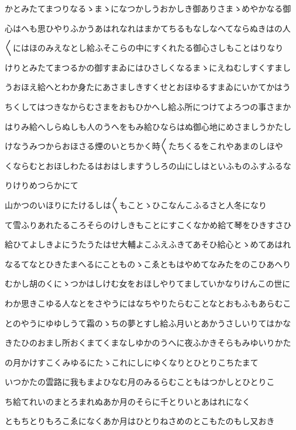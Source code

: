 \documentclass[a4paper,11pt,landscape]{ltjtarticle}
\begin{document}
かとみたてまつりなるゝまゝになつかしうおかしき御ありさまゝめやかなる御
\par\medskip
心はへも思ひやりふかうあはれなれはまかてちるもなしなへてならぬきはの人
\par\medskip
〱にはほのみえなとし給ふそこらの中にすくれたる御心さしもことはりなり
\par\medskip
けりとみたてまつるかの御すまゐにはひさしくなるまゝにえねむしすくすまし
\par\medskip
うおほえ給へとわか身たにあさましきすくせとおほゆるすまゐにいかてかはう
\par\medskip
ちくしてはつきなからむさまをおもひかへし給ふ所につけてよろつの事さまか
\par\medskip
はりみ給へしらぬしも人のうへをもみ給ひならはぬ御心地にめさましうかたし
\par\medskip
けなうみつからおほさる煙のいとちかく時〱たちくるをこれやあまのしほや
\par\medskip
くならむとおほしわたるはおはしますうしろの山にしはといふものふすふるな
\par\medskip
りけりめつらかにて
\par\medskip
山かつのいほりにたけるしは〱もことゝひこなんこふるさと人冬になり
\par\medskip
て雪ふりあれたるころそらのけしきもことにすこくなかめ給て琴をひきすさひ
\par\medskip
給ひてよしきよにうたうたはせ大輔よこふえふきてあそひ給心とゝめてあはれ
\par\medskip
なるてなとひきたまへるにことものゝこゑともはやめてなみたをのこひあへり
\par\medskip
むかし胡のくにゝつかはしけむ女をおほしやりてましていかなりけんこの世に
\par\medskip
わか思きこゆる人なとをさやうにはなちやりたらむことなとおもふもあらむこ
\par\medskip
とのやうにゆゆしうて霜のゝちの夢とすし給ふ月いとあかうさしいりてはかな
\par\medskip
きたひのおまし所おくまてくまなしゆかのうへに夜ふかきそらもみゆいりかた
\par\medskip
の月かけすこくみゆるにたゝこれにしにゆくなりとひとりこちたまて
\par\medskip
いつかたの雲路に我もまよひなむ月のみるらむこともはつかしとひとりこ
\par\medskip
ち給てれいのまとろまれぬあか月のそらに千とりいとあはれになく
\par\medskip
ともちとりもろこゑになくあか月はひとりねさめのとこもたのもし又おき
\par\medskip
\end{document}
